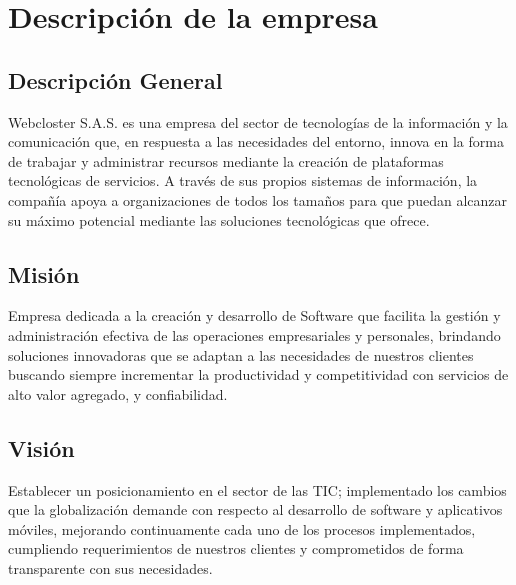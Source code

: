 \newpage
\section{Descripción de la empresa}

\subsection{Descripción General}
Webcloster S.A.S. es una empresa del sector de tecnologías de la información y la comunicación que, en respuesta a las necesidades del entorno, innova en la forma de trabajar y administrar recursos mediante la creación de plataformas tecnológicas de servicios. A través de sus propios sistemas de información, la compañía apoya a organizaciones de todos los tamaños para que puedan alcanzar su máximo potencial mediante las soluciones tecnológicas que ofrece.

\subsection{Misión}
Empresa dedicada a la creación y desarrollo de Software que facilita la gestión y administración efectiva de las operaciones empresariales y personales, brindando soluciones innovadoras que se adaptan a las necesidades de nuestros clientes buscando siempre incrementar la productividad y competitividad con servicios de alto valor agregado, y confiabilidad.

\subsection{Visión}
Establecer un posicionamiento en el sector de las TIC; implementado los cambios que la globalización demande con respecto al desarrollo de software y aplicativos móviles, mejorando continuamente cada uno de los procesos implementados, cumpliendo requerimientos de nuestros clientes y comprometidos de forma transparente con sus necesidades.

